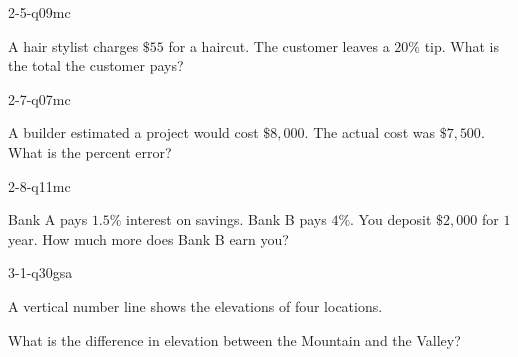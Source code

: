 \begin{practiceQuestion}{2-5-q09}{mc}
\begin{questionText}
A hair stylist charges $\$55$ for a haircut. The customer leaves a $20\%$ tip. What is the total the customer pays?
\end{questionText}
\end{practiceQuestion}

\begin{practiceQuestion}{2-7-q07}{mc}
\begin{questionText}
A builder estimated a project would cost $\$8{,}000$. The actual cost was $\$7{,}500$. What is the percent error?
\end{questionText}
\end{practiceQuestion}

\begin{practiceQuestion}{2-8-q11}{mc}
\begin{questionText}
Bank A pays $1.5\%$ interest on savings. Bank B pays $4\%$. You deposit $\$2{,}000$ for $1$ year. How much more does Bank B earn you?
\end{questionText}
\end{practiceQuestion}

\begin{practiceQuestion}{3-1-q30}{gsa}
\begin{questionText}
A vertical number line shows the elevations of four locations.

\begin{center}
\end{center}

What is the difference in elevation between the Mountain and the Valley?
\end{questionText}
\end{practiceQuestion}

